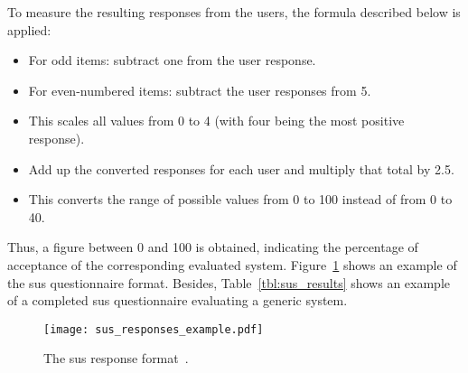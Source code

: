 To measure the resulting responses from the users, the formula described below
is applied: 

\begin{itemize}
 \item For odd items: subtract one from the user response.
 \item For even-numbered items: subtract the user responses from 5.
 \item This scales all values from 0 to 4 (with four being the most positive 
  response).
 \item Add up the converted responses for each user and multiply that total by 
  2.5. 
 \item This converts the range of possible values from 0 to 100 instead of from
 0 to 40.
\end{itemize}

Thus, a figure between 0 and 100 is obtained, indicating the percentage of 
acceptance of the corresponding evaluated system. 
Figure~\ref{fig:sus_responses_example} shows an example of the \ac{sus} 
questionnaire format. Besides, Table~\ref{tbl:sus_results} shows an example of 
a completed \ac{sus} questionnaire evaluating a generic system. 

\begin{figure}
\centering
\texttt{[image: sus\_responses\_example.pdf]}
\caption{The \ac{sus} response format~\citep{vt100}.}
\label{fig:sus_responses_example}
\end{figure}


